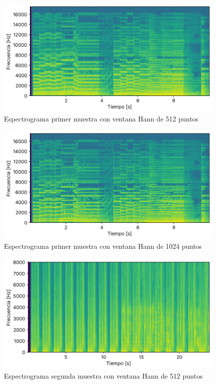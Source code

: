 \documentclass[12pt]{article}
\begin{document}
\iffalse
\begin{figure}[H]
\centering
\includegraphics{plot/cancion1_espectograma_hann_0512.png}
\caption{Espectrograma primer muestra con ventana Hann de 512 puntos}
\label{cancion1_espectograma_hann_0512}
\end{figure}

\begin{figure}[H]
\centering
\includegraphics{plot/cancion1_espectograma_hann_1024.png}
\caption{Espectrograma primer muestra con ventana Hann de 1024 puntos}
\label{cancion1_espectograma_hann_1024}
\end{figure}

\begin{figure}[H]
\centering
\includegraphics{plot/cancion2_espectograma_hann_0512.png}
\caption{Espectrograma segunda muestra con ventana Hann de 512 puntos}
\label{cancion2_espectograma_hann_0512}
\end{figure}
\end{document}

